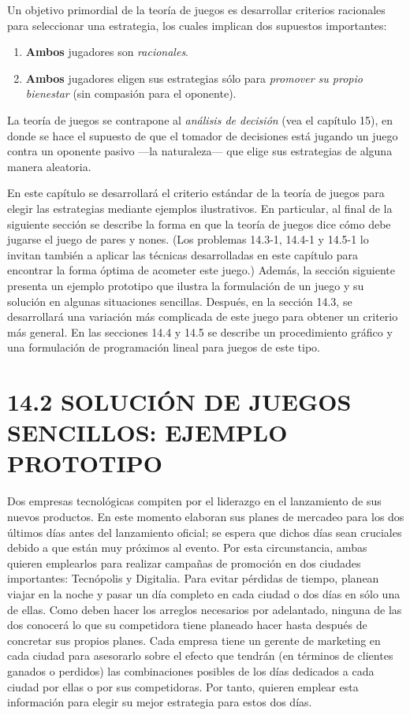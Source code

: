 \documentclass[12pt]{article}
\begin{document}
Un objetivo primordial de la teoría de juegos es desarrollar criterios racionales para seleccionar una estrategia, los cuales implican dos supuestos importantes:

\begin{enumerate}
    \item \textbf{Ambos} jugadores son \textit{racionales}.
    \item \textbf{Ambos} jugadores eligen sus estrategias sólo para \textit{promover su propio bienestar} (sin compasión para el oponente).
\end{enumerate}

La teoría de juegos se contrapone al \textit{análisis de decisión} (vea el capítulo 15), en donde se hace el supuesto de que el tomador de decisiones está jugando un juego contra un oponente pasivo —la naturaleza— que elige sus estrategias de alguna manera aleatoria.

En este capítulo se desarrollará el criterio estándar de la teoría de juegos para elegir las estrategias mediante ejemplos ilustrativos. En particular, al final de la siguiente sección se describe la forma en que la teoría de juegos dice cómo debe jugarse el juego de pares y nones. (Los problemas 14.3-1, 14.4-1 y 14.5-1 lo invitan también a aplicar las técnicas desarrolladas en este capítulo para encontrar la forma óptima de acometer este juego.) Además, la sección siguiente presenta un ejemplo prototipo que ilustra la formulación de un juego y su solución en algunas situaciones sencillas. Después, en la sección 14.3, se desarrollará una variación más complicada de este juego para obtener un criterio más general. En las secciones 14.4 y 14.5 se describe un procedimiento gráfico y una formulación de programación lineal para juegos de este tipo.


\section*{14.2 \quad SOLUCIÓN DE JUEGOS SENCILLOS: EJEMPLO PROTOTIPO}

Dos empresas tecnológicas compiten por el liderazgo en el lanzamiento de sus nuevos productos. En este momento elaboran sus planes de mercadeo para los dos últimos días antes del lanzamiento oficial; se espera que dichos días sean cruciales debido a que están muy próximos al evento. Por esta circunstancia, ambas quieren emplearlos para realizar campañas de promoción en dos ciudades importantes: Tecnópolis y Digitalia. Para evitar pérdidas de tiempo, planean viajar en la noche y pasar un día completo en cada ciudad o dos días en sólo una de ellas. Como deben hacer los arreglos necesarios por adelantado, ninguna de las dos conocerá lo que su competidora tiene planeado hacer hasta después de concretar sus propios planes. Cada empresa tiene un gerente de marketing en cada ciudad para asesorarlo sobre el efecto que tendrán (en términos de clientes ganados o perdidos) las combinaciones posibles de los días dedicados a cada ciudad por ellas o por sus competidoras. Por tanto, quieren emplear esta información para elegir su mejor estrategia para estos dos días.
\end{document}
